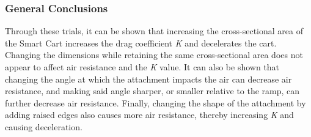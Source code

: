 \subsubsection{General Conclusions}
Through these trials, it can be shown that increasing the cross-sectional area of the Smart Cart increases the drag coefficient \textit{K}
and decelerates the cart. Changing the dimensions while retaining the same cross-sectional area does not appear
to affect air resistance and the \textit{K} value. It can also be shown that changing the angle at which the attachment impacts the air can
decrease air resistance, and making said angle sharper, or smaller relative to the ramp, can further decrease air resistance.
Finally, changing the shape of the attachment by adding raised edges also causes more air resistance, thereby increasing \textit{K} and
causing deceleration.